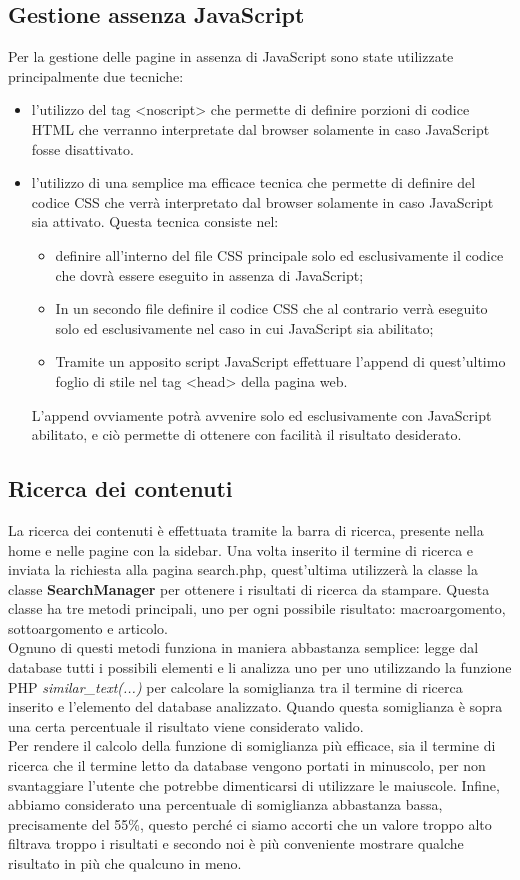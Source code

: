 \documentclass[12pt]{article}
\begin{document}
	\subsection{Gestione assenza JavaScript}
	Per la gestione delle pagine in assenza di JavaScript sono state utilizzate principalmente due tecniche:
	\begin{itemize}
			\item l'utilizzo del tag <noscript> che permette di definire porzioni di codice HTML che verranno interpretate dal browser solamente in caso JavaScript fosse disattivato.
			\item l'utilizzo di una semplice ma efficace tecnica che permette di definire del codice CSS che verrà interpretato dal browser solamente in caso JavaScript sia attivato. Questa tecnica consiste nel:
			\begin{itemize}
				\item definire all'interno del file CSS principale solo ed esclusivamente il codice che dovrà essere eseguito in assenza di JavaScript;
				\item In un secondo file definire il codice CSS che al contrario verrà eseguito solo ed esclusivamente nel caso in cui JavaScript sia abilitato;
				\item Tramite un apposito script JavaScript effettuare l'append di quest'ultimo foglio di stile nel tag <head> della pagina web.
			\end{itemize}
			L'append ovviamente potrà avvenire solo ed esclusivamente con JavaScript abilitato, e ciò permette di ottenere con facilità il risultato desiderato.
	\end{itemize}

	\subsection{Ricerca dei contenuti}
	La ricerca dei contenuti è effettuata tramite la barra di ricerca, presente nella home e nelle pagine con la sidebar. Una volta inserito il termine di ricerca e inviata la richiesta alla pagina search.php, quest'ultima utilizzerà la classe la classe \textbf{SearchManager} per ottenere i risultati di ricerca da stampare. Questa classe ha tre metodi principali, uno per ogni possibile risultato: macroargomento, sottoargomento e articolo. \\
Ognuno di questi metodi funziona in maniera abbastanza semplice: legge dal database tutti i possibili elementi e li analizza uno per uno utilizzando la funzione PHP \textit{similar\_text(...)} per calcolare la somiglianza tra il termine di ricerca inserito e l'elemento del database analizzato. Quando questa somiglianza è sopra una certa percentuale il risultato viene considerato valido. \\
Per rendere il calcolo della funzione di somiglianza più efficace, sia il termine di ricerca che il termine letto da database vengono portati in minuscolo, per non svantaggiare l'utente che potrebbe dimenticarsi di utilizzare le maiuscole. Infine, abbiamo considerato una percentuale di somiglianza abbastanza bassa, precisamente del 55\%, questo perché ci siamo accorti che un valore troppo alto filtrava troppo i risultati e secondo noi è più conveniente mostrare qualche risultato in più che qualcuno in meno.
	
\end{document}
